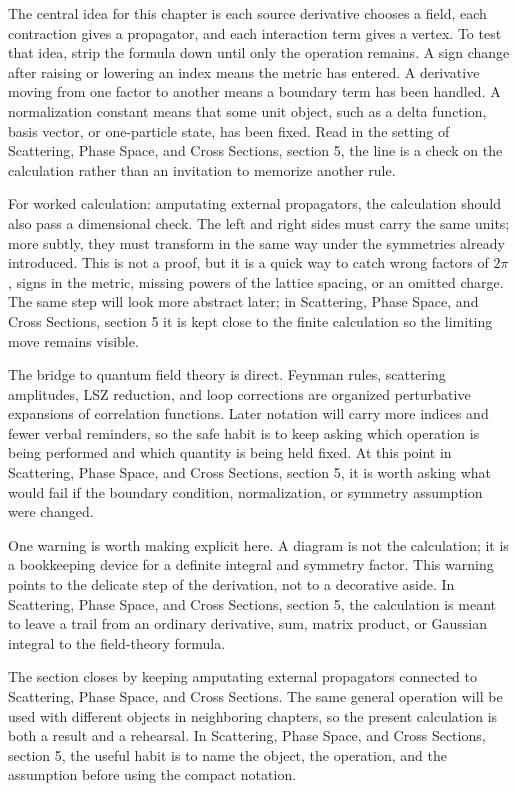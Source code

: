 The central idea for this chapter is each source derivative chooses a field, each contraction gives a propagator, and each interaction term gives a vertex.  To test that idea, strip the formula down until only the operation remains.  A sign change after raising or lowering an index means the metric has entered.  A derivative moving from one factor to another means a boundary term has been handled.  A normalization constant means that some unit object, such as a delta function, basis vector, or one-particle state, has been fixed.  Read in the setting of Scattering, Phase Space, and Cross Sections, section 5, the line is a check on the calculation rather than an invitation to memorize another rule.

For worked calculation: amputating external propagators, the calculation should also pass a dimensional check.  The left and right sides must carry the same units; more subtly, they must transform in the same way under the symmetries already introduced.  This is not a proof, but it is a quick way to catch wrong factors of \(2\pi\), signs in the metric, missing powers of the lattice spacing, or an omitted charge.  The same step will look more abstract later; in Scattering, Phase Space, and Cross Sections, section 5 it is kept close to the finite calculation so the limiting move remains visible.

The bridge to quantum field theory is direct.  Feynman rules, scattering amplitudes, LSZ reduction, and loop corrections are organized perturbative expansions of correlation functions.  Later notation will carry more indices and fewer verbal reminders, so the safe habit is to keep asking which operation is being performed and which quantity is being held fixed.  At this point in Scattering, Phase Space, and Cross Sections, section 5, it is worth asking what would fail if the boundary condition, normalization, or symmetry assumption were changed.

One warning is worth making explicit here.  A diagram is not the calculation; it is a bookkeeping device for a definite integral and symmetry factor.  This warning points to the delicate step of the derivation, not to a decorative aside.  In Scattering, Phase Space, and Cross Sections, section 5, the calculation is meant to leave a trail from an ordinary derivative, sum, matrix product, or Gaussian integral to the field-theory formula.

The section closes by keeping amputating external propagators connected to Scattering, Phase Space, and Cross Sections.  The same general operation will be used with different objects in neighboring chapters, so the present calculation is both a result and a rehearsal.  In Scattering, Phase Space, and Cross Sections, section 5, the useful habit is to name the object, the operation, and the assumption before using the compact notation.



